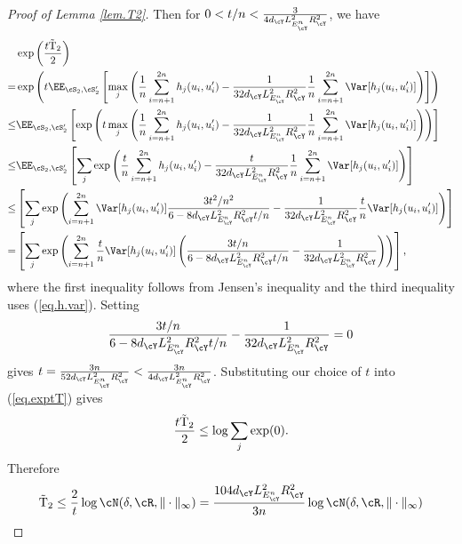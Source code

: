 \documentclass[11pt]{article} %
\begin{document}
\begin{proof}[Proof of Lemma \ref{lem.T2}]
	Then for $0<t/n<\frac{3}{4d_{\cY}L_{E^n_{\cY}}^2R_{\cY}^2}$, we have
	\begin{align}
		&\exp\left(\frac{t{\rm \tilde{T}_2}}{2}\right) \nonumber\\
		=& \exp\left( t\EE_{\cS_2,\cS'_2}\left[\max_j \left(\frac{1}{n}\sum_{i=n+1}^{2n} h_j(u_i,u'_i)-\frac{1}{32d_{\cY}L_{E^n_{\cY}}^2R_{\cY}^2}\frac{1}{n}\sum_{i=n+1}^{2n}\Var [h_j(u_i,u'_i)]\right)\right] \right) \nonumber\\
		\leq & \EE_{\cS_2,\cS'_2}\left[\exp\left( t\max_j\left( \frac{1}{n}\sum_{i=n+1}^{2n} h_j(u_i,u'_i)-\frac{1}{32d_{\cY}L_{E^n_{\cY}}^2R_{\cY}^2}\frac{1}{n}\sum_{i=n+1}^{2n}\Var [h_j(u_i,u'_i)]\right)\right)\right] \nonumber\\
		\leq &  \EE_{\cS_2,\cS'_2}\left[\sum_{j}\exp\left( \frac{t}{n}\sum_{i=n+1}^{2n} h_j(u_i,u'_i)-\frac{t}{32d_{\cY}L_{E^n_{\cY}}^2R_{\cY}^2}\frac{1}{n}\sum_{i=n+1}^{2n}\Var [h_j(u_i,u'_i)]\right)\right] \nonumber\\
		\leq & \left[\sum_{j}\exp\left( \sum_{i=n+1}^{2n} \Var[h_j(u_i,u'_i)]\frac{3t^2/n^2}{6-8d_{\cY}L_{E^n_{\cY}}^2R_{\cY}^2t/n}-\frac{1}{32d_{\cY}L_{E^n_{\cY}}^2R_{\cY}^2}\frac{t}{n}\Var [h_j(u_i,u'_i)]\right)\right] \nonumber\\
		=& \left[\sum_{j}\exp\left( \sum_{i=n+1}^{2n} \frac{t}{n}\Var[h_j(u_i,u'_i)]\left(\frac{3t/n}{6-8d_{\cY}L_{E^n_{\cY}}^2R_{\cY}^2t/n}-\frac{1}{32d_{\cY}L_{E^n_{\cY}}^2R_{\cY}^2}\right)\right)\right],
		\label{eq.exptT}
	\end{align}
	where the first inequality follows from Jensen's inequality and the third inequality uses (\ref{eq.h.var}). Setting
	$$
	\frac{3t/n}{6-8d_{\cY}L_{E^n_{\cY}}^2R_{\cY}^2t/n}-\frac{1}{32d_{\cY}L_{E^n_{\cY}}^2R_{\cY}^2}=0
	$$
	gives $t=\frac{3n}{52d_{\cY}L_{E^n_{\cY}}^2R_{\cY}^2}<\frac{3n}{4d_{\cY}L_{E^n_{\cY}}^2R_{\cY}^2} $. Substituting our choice of $t$ into (\ref{eq.exptT}) gives
	\begin{align*}
		\frac{t{\rm \tilde{T}_2}}{2}\leq \log \sum_j \exp(0).
	\end{align*}
	Therefore
	\begin{align*}
		{\rm \tilde{T}_2}\leq \frac{2}{t}\log\cN(\delta,\cR,\|\cdot\|_{\infty})=\frac{104d_{\cY}L_{E^n_{\cY}}^2R_{\cY}^2}{3n}\log \cN(\delta,\cR,\|\cdot\|_{\infty})
	\end{align*}

\end{proof}
\end{document}
